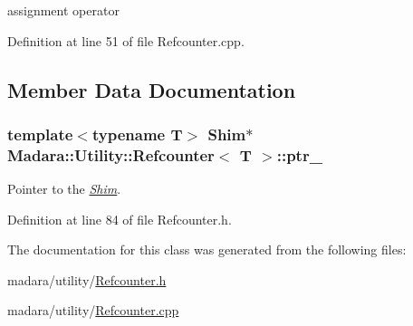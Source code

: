 assignment operator 



Definition at line 51 of file Refcounter.cpp.



\subsection{Member Data Documentation}
\hypertarget{classMadara_1_1Utility_1_1Refcounter_a0840e75dea9c1332af0a2bc945c13b75}{
\subsubsection[{ptr\_\-}]{\setlength{\rightskip}{0pt plus 5cm}template$<$typename T$>$ {\bf Shim}$\ast$ {\bf Madara::Utility::Refcounter}$<$ T $>$::{\bf ptr\_\-}}}
\label{d5/dfa/classMadara_1_1Utility_1_1Refcounter_a0840e75dea9c1332af0a2bc945c13b75}


Pointer to the {\itshape \hyperlink{structMadara_1_1Utility_1_1Refcounter_1_1Shim}{Shim}\/}. 



Definition at line 84 of file Refcounter.h.



The documentation for this class was generated from the following files:\begin{DoxyCompactItemize}
\item 
madara/utility/\hyperlink{Refcounter_8h}{Refcounter.h}\item 
madara/utility/\hyperlink{Refcounter_8cpp}{Refcounter.cpp}\end{DoxyCompactItemize}
